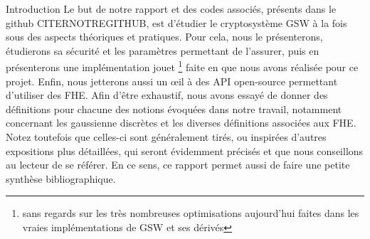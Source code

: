 \begin{section}{Introduction}
Le but de notre rapport et des codes associés, présents dans le github CITERNOTREGITHUB, est d'étudier 
le cryptosystème GSW à la fois sous des aspects théoriques et pratiques. 
Pour cela, nous le présenterons, étudierons sa sécurité et les paramètres permettant de l'assurer, puis en présenterons une implémentation jouet
\footnote{sans regards sur les très nombreuses optimisations aujourd'hui faites dans les vraies implémentations
de GSW et ses dérivés} faite en  que nous avons réalisée pour ce projet.
Enfin, nous jetterons aussi un \oe{}il à des API open-source permettant d'utiliser des FHE.
Afin d'être exhaustif, nous avons essayé de donner des définitions pour chacune des notions évoquées dans notre travail,
notamment concernant les gaussienne discrètes et les diverses définitions associées aux FHE. Notez toutefois que 
celles-ci sont généralement tirés, ou inspirées d'autres expositions plus détaillées, qui seront évidemment précisés
et que nous conseillons au lecteur de se référer. En ce sens, ce rapport permet aussi de faire une petite synthèse 
bibliographique.
\end{section}

